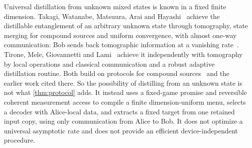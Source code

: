 Universal distillation from unknown mixed states is known in a fixed finite dimension. Takagi, Watanabe, Matsuura, Arai and
Hayashi~\cite{TWMAH26} achieve the distillable entanglement of an arbitrary unknown state through tomography, state merging for
compound sources and uniform convergence, with almost one-way communication: Bob sends back tomographic information at a
vanishing rate~\cite[Theorem~8 and Appendix~B.3(f)]{TWMAH26}. Tirone, Mele, Giovannetti and Lami~\cite{TMGL26} achieve it
independently with tomography by local operations and classical communication and a robust adaptive distillation routine. Both
build on protocols for compound sources~\cite{BJ14} and the earlier work cited there. So the possibility of distilling from an
unknown state is not what \cref{thm:protocol} adds. It instead uses a fixed-game promise and reversible coherent measurement
access to compile a finite dimension-uniform menu, selects a decoder with Alice-local data, and extracts a fixed target from one
retained input copy, using only communication from Alice to Bob. It does not optimize a universal asymptotic rate and does not
provide an efficient device-independent procedure.
